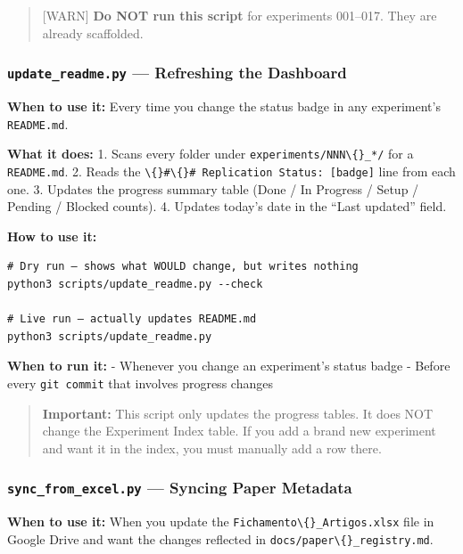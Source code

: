 \begin{quote}
\small {[}WARN{]} \textbf{Do NOT run this script} for experiments 001--017.
They are already scaffolded.
\end{quote}

\subsubsection{\texorpdfstring{\texttt{update\_readme.py} --- Refreshing
the
Dashboard}{update\_readme.py --- Refreshing the Dashboard}}\label{update_readme.py-refreshing-the-dashboard}

\textbf{When to use it:} Every time you change the status badge in any
experiment's \texttt{README.md}.

\textbf{What it does:} 1. Scans every folder under
\texttt{experiments/NNN\textbackslash\{\}\_*/} for a
\texttt{README.md}. 2. Reads the
\texttt{\textbackslash\{\}\#\textbackslash\{\}\# Replication Status: [badge]} line from
each one. 3. Updates the progress summary table (Done / In Progress /
Setup / Pending / Blocked counts). 4. Updates today's date in the ``Last
updated'' field.

\textbf{How to use it:}

\begin{verbatim}
# Dry run — shows what WOULD change, but writes nothing
python3 scripts/update_readme.py --check

# Live run — actually updates README.md
python3 scripts/update_readme.py
\end{verbatim}

\textbf{When to run it:} - Whenever you change an experiment's status
badge - Before every \texttt{git commit} that involves
progress changes

\begin{quote}
\small \textbf{Important:} This script only updates the progress tables. It
does NOT change the Experiment Index table. If you add a brand new
experiment and want it in the index, you must manually add a row there.
\end{quote}

\subsubsection{\texorpdfstring{\texttt{sync\_from\_excel.py} --- Syncing
Paper
Metadata}{sync\_from\_excel.py --- Syncing Paper Metadata}}\label{sync_from_excel.py-syncing-paper-metadata}

\textbf{When to use it:} When you update the
\texttt{Fichamento\textbackslash\{\}\_Artigos.xlsx} file in Google Drive
and want the changes reflected in
\texttt{docs/paper\textbackslash\{\}\_registry.md}.

